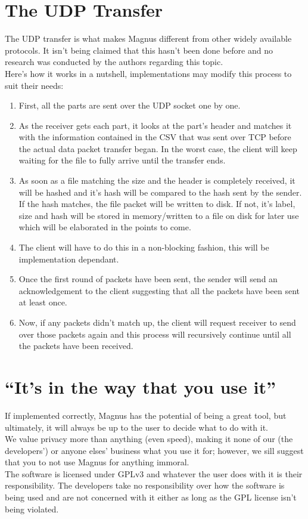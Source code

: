 \documentclass{article}
\begin{document}
\section{The UDP Transfer}
The UDP transfer is what makes Magnus different from other widely available
protocols. It isn't being claimed that this hasn't been done before and no
research was conducted by the authors regarding this topic. \\

Here's how it works in a nutshell, implementations may modify this process to
suit their needs:
\begin{enumerate}
      \item First, all the parts are sent over the UDP socket one by one.
      \item As the receiver gets each part, it looks at the part's header and matches it
            with the information contained in the CSV that was sent over TCP before the
            actual data packet transfer began. In the worst case, the client will keep
            waiting for the file to fully arrive until the transfer ends.
      \item As soon as a file matching the size and the header is completely received, it
            will be hashed and it's hash will be compared to the hash sent by the sender.
            If the hash matches, the file packet will be written to disk. If not, it's
            label, size and hash will be stored in memory/written to a file on disk for
            later use which will be elaborated in the points to come.
      \item The client will have to do this in a non-blocking fashion, this will be
            implementation dependant.
      \item Once the first round of packets have been sent, the sender will send an
            acknowledgement to the client suggesting that all the packets have been sent at
            least once.
      \item Now, if any packets didn't match up, the client will request receiver to send
            over those packets again and this process will recursively continue until all
            the packets have been received.
\end{enumerate}

\section{``It's in the way that you use it''}
If implemented correctly, Magnus has the potential of being a great tool, but
ultimately, it will always be up to the user to decide what to do with it. \\

We value privacy more than anything (even speed), making it none of our (the
developers') or anyone elses' business what you use it for; however, we sill
suggest that you to not use Magnus for anything immoral. \\

The software is licensed under GPLv3 and whatever the user does with it is
their responsibility. The developers take no responsibility over how the
software is being used and are not concerned with it either as long as the GPL
license isn't being violated.
\end{document}
